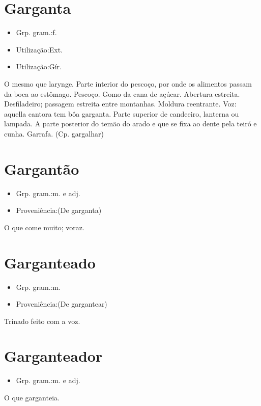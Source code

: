 \section{Garganta}
\begin{itemize}
\item {Grp. gram.:f.}
\end{itemize}
\begin{itemize}
\item {Utilização:Ext.}
\end{itemize}
\begin{itemize}
\item {Utilização:Gír.}
\end{itemize}
O mesmo que \textunderscore larynge\textunderscore .
Parte interior do pescoço, por onde os alimentos passam da boca ao estômago.
Pescoço.
Gomo da cana de açúcar.
Abertura estreita.
Desfiladeiro; passagem estreita entre montanhas.
Moldura reentrante.
Voz: \textunderscore aquella cantora tem bôa garganta\textunderscore .
Parte superior de candeeiro, lanterna ou lampada.
A parte posterior do temão do arado e que se fixa ao dente pela teiró e cunha.
Garrafa.
(Cp. \textunderscore gargalhar\textunderscore )
\section{Gargantão}
\begin{itemize}
\item {Grp. gram.:m.  e  adj.}
\end{itemize}
\begin{itemize}
\item {Proveniência:(De \textunderscore garganta\textunderscore )}
\end{itemize}
O que come muito; voraz.
\section{Garganteado}
\begin{itemize}
\item {Grp. gram.:m.}
\end{itemize}
\begin{itemize}
\item {Proveniência:(De \textunderscore gargantear\textunderscore )}
\end{itemize}
Trinado feito com a voz.
\section{Garganteador}
\begin{itemize}
\item {Grp. gram.:m.  e  adj.}
\end{itemize}
O que garganteia.
